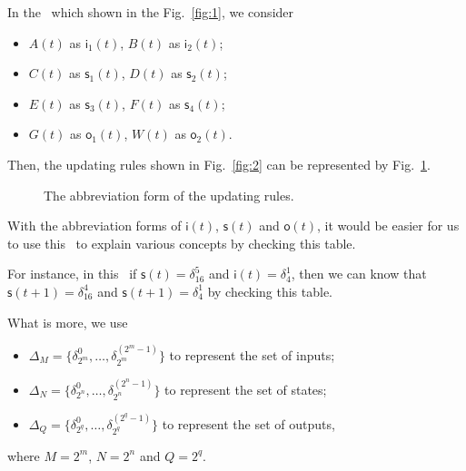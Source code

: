 In the \BCN\ which shown in the Fig.~\ref{fig:1}, we consider 
\begin{itemize}
  \item $A(t)$ as $\mathsf{i}_{1}(t)$, $B(t)$ as $\mathsf{i}_{2}(t)$;
  \item $C(t)$ as $\mathsf{s}_{1}(t)$, $D(t)$ as $\mathsf{s}_{2}(t)$;
  \item $E(t)$ as $\mathsf{s}_{3}(t)$, $F(t)$ as $\mathsf{s}_{4}(t)$;
  \item $G(t)$ as $\mathsf{o}_{1}(t)$, $W(t)$ as $\mathsf{o}_{2}(t)$.
\end{itemize}

Then, the updating rules shown in Fig.~\ref{fig:2} can be represented by Fig.~\ref{fig:6}.
 \begin{figure}[thpb]
      \centering
      
      \caption{The abbreviation form of the updating rules.}
      \label{fig:6}
   \end{figure}
  
   With the abbreviation forms of $\mathsf{i}(t)$, $\mathsf{s}(t)$ and $\mathsf{o}(t)$, it would be easier for us to use this \BCN\ to explain various concepts by checking this table.
   
   For instance, in this \BCN\ if $\mathsf{s}(t)=\delta^5_{16}$ and $\mathsf{i}(t)=\delta^1_{4}$, then we can know that $\mathsf{s}(t+1)=\delta^4_{16}$  and $\mathsf{s}(t+1)=\delta^1_{4}$ by checking this table. 
   
    What is more, we use 
   \begin{itemize}
 \item $\Delta_M=\{\delta^0_{2^m},\ldots,\delta^{({2^m}-1)}_{2^m} \}$ to represent the set of inputs; 
 \item $\Delta_N=\{\delta^0_{2^n},\ldots,\delta^{({2^n}-1)}_{2^n} \}$ to represent the set of states; 
  \item $\Delta_Q=\{\delta^0_{2^q},\ldots,\delta^{({2^q}-1)}_{2^q} \}$ to represent the set of outputs,
\end{itemize}
where $M=2^m$, $N=2^n$ and $Q=2^q$.

